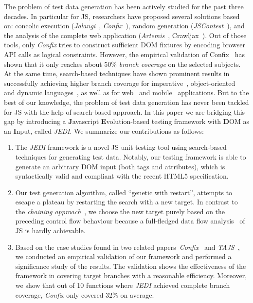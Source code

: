The problem of test data generation has been actively studied for the past three decades. In particular for JS, researchers have proposed several solutions based on: concolic execution (\emph{Jalangi}~\cite{sen2013jalangi}, \emph{Confix}~\cite{amin:ase15}), random generation (\emph{JSContest}~\cite{heidegger2010contract}), and the analysis of the complete web application (\emph{Artemis}~\cite{artemis2011}, Crawljax~\cite{mesbah2012crawling}). Out of those tools, only \emph{Confix} tries to construct sufficient DOM fixtures by encoding browser API calls as logical constraints. However, the empirical validation of Confix~\cite{amin:ase15} has shown that it only reaches about 50\% \emph{branch coverage} on the selected subjects. At the same time, search-based techniques have shown prominent results in successfully achieving higher branch coverage for imperative~\cite{wegener2001evolutionary}, object-oriented~\cite{fraser2011evosuite} and dynamic languages~\cite{irawan2016test, wibowo2015unit}, as well as for web~\cite{alshahwan2011automated} and mobile~\cite{mao2016sapienz} applications. But to the best of our knowledge, the problem of test data generation has never been tackled for JS with the help of search-based approach. In this paper we are bridging this gap by introducing a \textbf{J}avascript \textbf{E}volution-based testing framework with \textbf{D}OM as an \textbf{I}nput, called \emph{JEDI}. We summarize our contributions as follows:
\begin{enumerate}[leftmargin=5mm]
\item The \emph{JEDI} framework is a novel JS unit testing tool using search-based techniques for generating test data. Notably, our testing framework is able to generate an arbitrary DOM input (both tags and attributes), which is syntactically valid and compliant with the recent HTML5 specification.
\item Our test generation algorithm, called ``genetic with restart'', attempts to escape a plateau by restarting the search with a new target. In contrast to the \emph{chaining approach}~\cite{ferguson1996chaining}, we choose the new target purely based on the preceding control flow behaviour because a full-fledged data flow analysis~\cite{jang2009points} of JS is hardly achievable.
\item Based on the case studies found in two related papers~\emph{Confix}~\cite{amin:ase15} and \emph{TAJS}~\cite{dom2011}, we conducted an empirical validation of our framework and performed a significance study of the results. The validation shows the effectiveness of the framework in covering target branches with a reasonable efficiency. Moreover, we show that out of 10 functions where \emph{JEDI} achieved complete branch coverage, \emph{Confix} only covered 32\% on average.
\end{enumerate}


